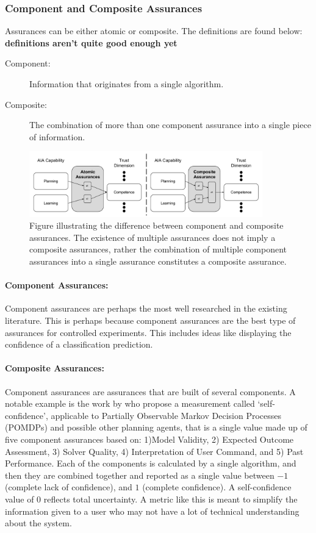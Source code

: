 \subsubsection{Component and Composite Assurances}
Assurances can be either atomic or composite. The definitions are found below: \textbf{definitions aren't quite good enough yet}

\begin{description}
    \item [Component:] Information that originates from a single algorithm.
    \item [Composite:] The combination of more than one component assurance into a single piece of information. 
\end{description}

    \begin{figure}[!htbp]
        \centering
        \includegraphics[width=0.9\textwidth]{Figures/Assurance_component_composite.pdf}
        \caption{Figure illustrating the difference between component and composite assurances. The existence of multiple assurances does not imply a composite assurances, rather the combination of multiple component assurances into a single assurance constitutes a composite assurance.}
        \label{fig:assurance_mapping}
    \end{figure}

\paragraph{Component Assurances:} Component assurances are perhaps the most well researched in the existing literature. This is perhaps because component assurances are the best type of assurances for controlled experiments. This includes ideas like displaying the confidence of a classification prediction.

\paragraph{Composite Assurances:} Component assurances are assurances that are built of several components. A notable example is the work by \citet{Aitken2016-cv} who propose a measurement called `self-confidence', applicable to Partially Observable Markov Decision Processes (POMDPs) and possible other planning agents, that is a single value made up of five component assurances based on: 1)Model Validity, 2) Expected Outcome Assessment, 3) Solver Quality, 4) Interpretation of User Command, and 5) Past Performance. Each of the components is calculated by a single algorithm, and then they are combined together and reported as a single value between $-1$ (complete lack of confidence), and $1$ (complete confidence). A self-confidence value of $0$ reflects total uncertainty. A metric like this is meant to simplify the information given to a user who may not have a lot of technical understanding about the system.
